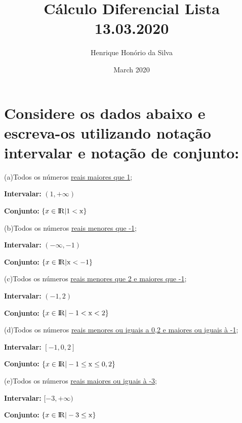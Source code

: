 \documentclass{article}
\title{Cálculo Diferencial Lista 13.03.2020}
\author{Henrique Honório da Silva }
\date{March 2020}
\begin{document}
\maketitle

	\section{Considere os dados abaixo e escreva-os utilizando notação intervalar e notação de conjunto:}

		\hspace{5mm} (a)Todos os números \underline{reais maiores que 1};

			\hspace{5mm} \textbf{Intervalar:} $(1,+\infty)$

			\hspace{5mm}  \textbf{Conjunto:} $\{x \in \rm I\!R | 1 < x \}$

		\vspace{5mm}
		(b)Todos os números \underline{reais menores que -1};

			\hspace{5mm} \textbf{Intervalar:} $(-\infty,-1)$

			\hspace{5mm}  \textbf{Conjunto:} $\{x \in \rm I\!R | x < -1 \}$

		\vspace{5mm}
		(c)Todos os números \underline{reais menores que 2 e maiores que -1};

			\hspace{5mm} \textbf{Intervalar:} $(-1, 2)$

			\hspace{5mm}  \textbf{Conjunto:} $\{x \in \rm I\!R | -1 < x < 2 \}$

		\vspace{5mm}
		(d)Todos os números \underline{reais menores ou iguais a 0,2 e maiores ou iguais à -1};

			\hspace{5mm} \textbf{Intervalar:} $[-1, 0,2]$

			\hspace{5mm}  \textbf{Conjunto:} $\{x \in \rm I\!R | -1 \leq x \leq 0,2 \}$

		\vspace{5mm}
		(e)Todos os números \underline{reais maiores ou iguais à -3};

			\hspace{5mm} \textbf{Intervalar:} $[-3, +\infty)$

			\hspace{5mm}  \textbf{Conjunto:} $\{x \in \rm I\!R | -3 \leq x \}$
\end{document}
